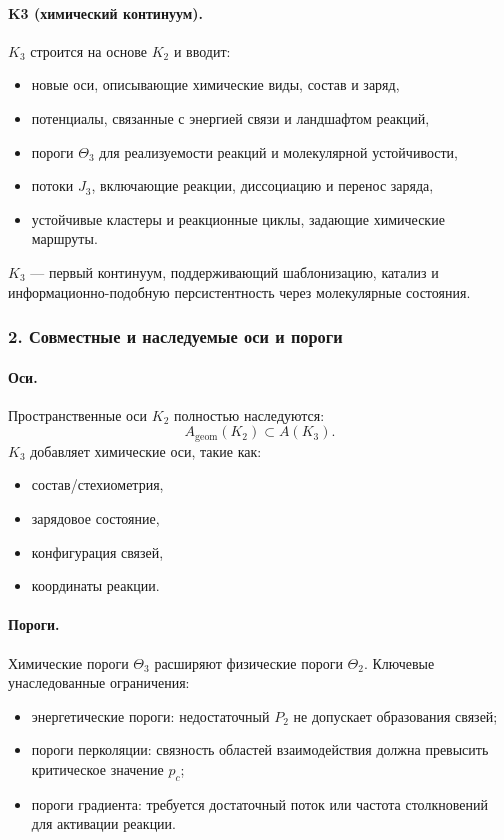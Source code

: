 \paragraph{K3 (химический континуум).}
$K_3$ строится на основе $K_2$ и вводит:
\begin{itemize}
  \item новые оси, описывающие химические виды, состав и заряд,
  \item потенциалы, связанные с энергией связи и ландшафтом реакций,
  \item пороги $\Theta_3$ для реализуемости реакций и молекулярной
        устойчивости,
  \item потоки $J_3$, включающие реакции, диссоциацию и перенос заряда,
  \item устойчивые кластеры и реакционные циклы, задающие химические
        маршруты.
\end{itemize}

$K_3$ — первый континуум, поддерживающий шаблонизацию, катализ и
информационно-подобную персистентность через молекулярные состояния.

\subsubsection{2. Совместные и наследуемые оси и пороги}

\paragraph{Оси.}
Пространственные оси $K_2$ полностью наследуются:
\[
A_{\mathrm{geom}}(K_2) \subset A(K_3).
\]
$K_3$ добавляет химические оси, такие как:
\begin{itemize}
  \item состав/стехиометрия,
  \item зарядовое состояние,
  \item конфигурация связей,
  \item координаты реакции.
\end{itemize}

\paragraph{Пороги.}
Химические пороги $\Theta_3$ расширяют физические пороги $\Theta_2$.
Ключевые унаследованные ограничения:
\begin{itemize}
  \item энергетические пороги: недостаточный $P_2$ не допускает образования
        связей;
  \item пороги перколяции: связность областей взаимодействия должна
        превысить критическое значение $p_c$;
  \item пороги градиента: требуется достаточный поток или частота столкновений
        для активации реакции.
\end{itemize}

